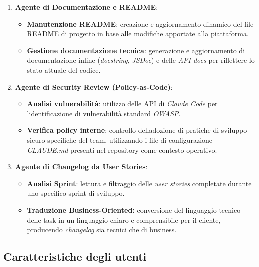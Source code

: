 \documentclass[12pt, a4paper]{article}
\begin{document}
\begin{enumerate}
\def\labelenumi{\arabic{enumi}.}
\item
  \textbf{Agente di Documentazione e README}:

  \begin{itemize}
  \item
    \textbf{Manutenzione README}: creazione e aggiornamento dinamico del
    file README di progetto in base alle modifiche apportate alla
    piattaforma.
  \item
    \textbf{Gestione documentazione tecnica}: generazione e
    aggiornamento di documentazione inline (\emph{docstring},
    \emph{JSDoc}) e delle \emph{API docs} per riflettere lo stato
    attuale del codice.
  \end{itemize}
\item
  \textbf{Agente di Security Review (Policy-as-Code)}:

  \begin{itemize}
  \item
    \textbf{Analisi vulnerabilità}: utilizzo delle API di \emph{Claude
    Code} per l\textquotesingle identificazione di vulnerabilità
    standard \emph{OWASP}.
  \item
    \textbf{Verifica policy interne}: controllo
    dell\textquotesingle adozione di pratiche di sviluppo sicuro
    specifiche del team, utilizzando i file di configurazione
    \emph{CLAUDE.md} presenti nel repository come contesto operativo.
  \end{itemize}
\item
  \textbf{Agente di Changelog da User Stories}:

  \begin{itemize}
  \item
    \textbf{Analisi Sprint}: lettura e filtraggio delle \emph{user
    stories} completate durante uno specifico sprint di sviluppo.
  \item
    \textbf{Traduzione Business-Oriented:} conversione del linguaggio
    tecnico delle task in un linguaggio chiaro e comprensibile per il
    cliente, producendo \emph{changelog} sia tecnici che di business.
  \end{itemize}
\end{enumerate}

\subsection{Caratteristiche degli
utenti}\label{caratteristiche-degli-utenti}
\end{document}
